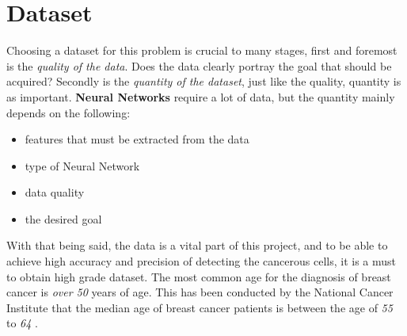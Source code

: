 \documentclass[12pt]{extarticle}
\begin{document}
	
	
	
	
	\newpage
	\section{Dataset}\label{Data}
	Choosing a dataset for this problem is crucial to many stages, first and foremost is the \emph{quality of the data}. Does the data clearly portray the goal that should be acquired? Secondly is the \emph{quantity of the dataset}, just like the quality, quantity is as important. \textbf{Neural Networks} require a lot of data, but the quantity mainly depends on the following:
	\begin{itemize}
		\item features that must be extracted from the data
		\item type of Neural Network
		\item data quality
		\item the desired goal
	\end{itemize}
	With that being said, the data is a vital part of this project, and to be able to achieve high accuracy and precision of detecting the cancerous cells, it is a must to obtain high grade dataset. 
	The most common age for the diagnosis of breast cancer is \emph{over 50} years of age. This has been conducted by the National Cancer Institute that the median age of breast cancer patients is between the age of \emph{55} to \emph{64} \cite{CDC}. 
	\\[5mm]
\end{document}
